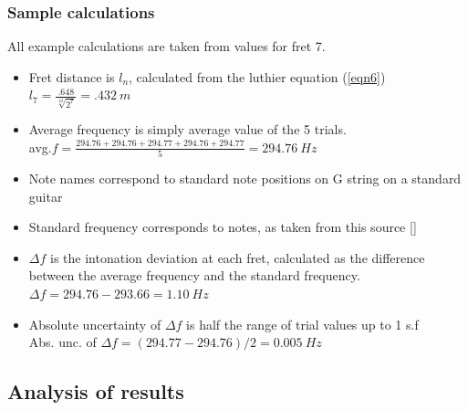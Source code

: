 \documentclass[11pt]{article}
\begin{document}
\begin{flushleft}
            \subsubsection*{Sample calculations}
            All example calculations are taken from values for fret 7.
            \begin{itemize}
                \item Fret distance is $l_n$, calculated from the luthier equation (\ref{eqn6}) \\
                $l_7 = \frac{.648}{\sqrt[12]{2^7}} = \SI{.432}{m}$
                \item Average frequency is simply average value of the 5 trials. \\
                avg.$f = \frac{294.76 + 294.76 + 294.77 + 294.76 + 294.77 }{5} = \SI{294.76}{Hz}$
                \item Note names correspond to standard note positions on G string on a standard guitar
                \item Standard frequency corresponds to notes, as taken from this source []
                \item $\Delta f$ is the intonation deviation at each fret, calculated as the difference between the average frequency and the standard frequency.\\
                $\Delta f = 294.76 - 293.66 = \SI{1.10}{Hz}$
                \item Absolute uncertainty of $\Delta f$ is half the range of trial values up to 1 s.f\\
                Abs. unc. of $\Delta f = (294.77-294.76)/2 = \SI{0.005}{Hz}$
            \end{itemize}
        \subsection{Analysis of results}

\end{flushleft}
\end{document}
